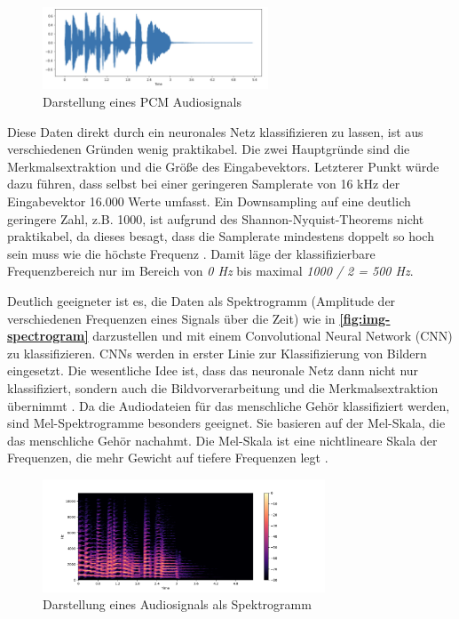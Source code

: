 \begin{figure}[h!]
\centering
\includegraphics[width=0.6\textwidth]{images/08_durchfuehrung/nn/waveform_plot.png}
\caption{Darstellung eines PCM Audiosignals \cite{cite-img-spectrogram}}
\label{fig:img-pcm-graph}
\end{figure}

Diese Daten direkt durch ein neuronales Netz klassifizieren zu lassen, ist aus verschiedenen Gründen wenig praktikabel. Die zwei Hauptgründe sind die Merkmalsextraktion und die Größe des Eingabevektors. Letzterer Punkt würde dazu führen, dass selbst bei einer geringeren Samplerate von 16 kHz der Eingabevektor 16.000 Werte umfasst. Ein Downsampling auf eine deutlich geringere Zahl, z.B. 1000, ist aufgrund des Shannon-Nyquist-Theorems nicht praktikabel, da dieses besagt, dass die Samplerate mindestens doppelt so hoch sein muss wie die höchste Frequenz \cite{nyquist}. Damit läge der klassifizierbare Frequenzbereich nur im Bereich von \textit{0 Hz} bis maximal \textit{1000 / 2 = 500 Hz}.

Deutlich geeigneter ist es, die Daten als Spektrogramm (Amplitude der verschiedenen Frequenzen eines Signals über die Zeit) wie in \textbf{\autoref{fig:img-spectrogram}} darzustellen und mit einem Convolutional Neural Network (CNN) zu klassifizieren. CNNs werden in erster Linie zur Klassifizierung von Bildern eingesetzt. Die wesentliche Idee ist, dass das neuronale Netz dann nicht nur klassifiziert, sondern auch die Bildvorverarbeitung und die Merkmalsextraktion übernimmt \cite{how-cnn-work}. Da die Audiodateien für das menschliche Gehör klassifiziert werden, sind Mel-Spektrogramme besonders geeignet. Sie basieren auf der Mel-Skala, die das menschliche Gehör nachahmt. Die Mel-Skala ist eine nichtlineare Skala der Frequenzen, die mehr Gewicht auf tiefere Frequenzen legt \cite{mel-spectrogram}.

\begin{figure}[h!]
\centering
\includegraphics[width=0.75\textwidth]{images/08_durchfuehrung/nn/spectrogram_plot.png}
\caption{Darstellung eines Audiosignals als Spektrogramm \cite{cite-img-spectrogram}}
\label{fig:img-spectrogram}
\end{figure}

